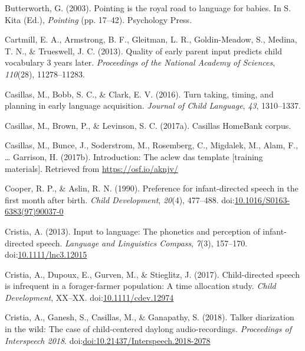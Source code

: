 \documentclass[floatsintext,man]{apa6}
\theoremstyle{definition}
\theoremstyle{definition}
\theoremstyle{definition}
\theoremstyle{remark}
\begin{document}
\hypertarget{ref-butterworth2003pointing}{}
Butterworth, G. (2003). Pointing is the royal road to language for
babies. In S. Kita (Ed.), \emph{Pointing} (pp. 17--42). Psychology
Press.

\hypertarget{ref-cartmill2013quality}{}
Cartmill, E. A., Armstrong, B. F., Gleitman, L. R., Goldin-Meadow, S.,
Medina, T. N., \& Trueswell, J. C. (2013). Quality of early parent input
predicts child vocabulary 3 years later. \emph{Proceedings of the
National Academy of Sciences}, \emph{110}(28), 11278--11283.

\hypertarget{ref-casillas2016turn}{}
Casillas, M., Bobb, S. C., \& Clark, E. V. (2016). Turn taking, timing,
and planning in early language acquisition. \emph{Journal of Child
Language}, \emph{43}, 1310--1337.

\hypertarget{ref-Casillas-HB}{}
Casillas, M., Brown, P., \& Levinson, S. C. (2017a). Casillas HomeBank
corpus.

\hypertarget{ref-casillas2017ACLEWDAS}{}
Casillas, M., Bunce, J., Soderstrom, M., Rosemberg, C., Migdalek, M.,
Alam, F., \ldots{} Garrison, H. (2017b). Introduction: The aclew das
template {[}training materials{]}. Retrieved from
\url{https://osf.io/aknjv/}

\hypertarget{ref-cooper1990preference}{}
Cooper, R. P., \& Aslin, R. N. (1990). Preference for infant-directed
speech in the first month after birth. \emph{Child Development},
\emph{20}(4), 477--488.
doi:\href{https://doi.org/10.1016/S0163-6383(97)90037-0}{10.1016/S0163-6383(97)90037-0}

\hypertarget{ref-cristia2013input}{}
Cristia, A. (2013). Input to language: The phonetics and perception of
infant-directed speech. \emph{Language and Linguistics Compass},
\emph{7}(3), 157--170.
doi:\href{https://doi.org/10.1111/lnc3.12015}{10.1111/lnc3.12015}

\hypertarget{ref-cristia2017child}{}
Cristia, A., Dupoux, E., Gurven, M., \& Stieglitz, J. (2017).
Child-directed speech is infrequent in a forager-farmer population: A
time allocation study. \emph{Child Development}, XX--XX.
doi:\href{https://doi.org/10.1111/cdev.12974}{10.1111/cdev.12974}

\hypertarget{ref-cristia2018talker}{}
Cristia, A., Ganesh, S., Casillas, M., \& Ganapathy, S. (2018). Talker
diarization in the wild: The case of child-centered daylong
audio-recordings. \emph{Proceedings of Interspeech 2018}.
doi:\href{https://doi.org/doi:10.21437/Interspeech.2018-2078}{doi:10.21437/Interspeech.2018-2078}
\end{document}
